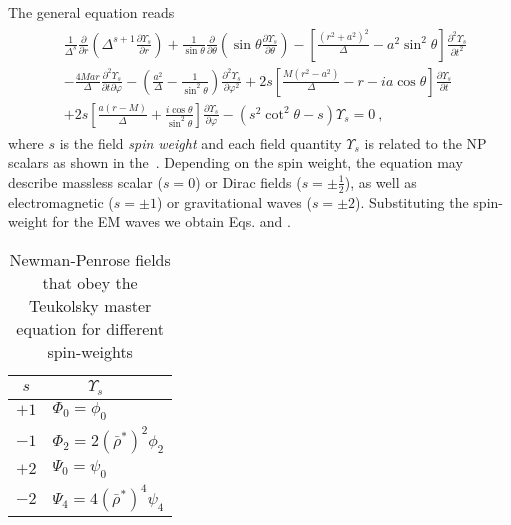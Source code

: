 The general equation reads
\begin{align}
    \begin{split}
        & \frac{1}{\Delta^s} \frac{\partial}{\partial r} \left( \Delta^{s+1} \frac{\partial \Upsilon_s}{\partial r} \right) 
        + \frac{1}{\sin\theta} \frac{\partial}{\partial\theta} \left( \sin\theta \frac{\partial \Upsilon_s}{\partial \theta} \right) 
        - \left[ \frac{(r^2+a^2)^2}{\Delta} - a^2 \sin^2\theta \right]\frac{\partial^2 \Upsilon_s}{\partial t^2} \\[0.15cm]
        & - \frac{4 M a r}{\Delta}\frac{\partial^2 \Upsilon_s}{\partial t \partial \varphi} 
        - \left( \frac{a^2}{\Delta} -\frac{1}{\sin^2\theta} \right)\frac{\partial^2 \Upsilon_s}{\partial \varphi^2} 
        + 2s\left[ \frac{M(r^2-a^2)}{\Delta} - r - i a \cos\theta \right] \frac{\partial \Upsilon_s}{\partial t} \\[0.15cm]
        &+ 2s\left[ \frac{a(r-M)}{\Delta}+\frac{i \cos\theta}{\sin^2\theta}\right] \frac{\partial \Upsilon_s}{\partial \varphi}
        - (s^2 \cot^2\theta - s) \Upsilon_s = 0 ~,
    \end{split}
    \label{eq3:teukolsky}
\end{align}
where $s$ is the field \emph{spin weight} and each field quantity $\Upsilon_s$ is related to the NP scalars as shown in the~.
Depending on the spin weight, the equation may describe massless scalar ($s=0$) or Dirac fields ($s=\pm \tfrac{1}{2}$), as well as electromagnetic ($s=\pm 1$) or gravitational waves ($s=\pm 2$). Substituting the spin-weight for the EM waves we obtain Eqs.  and .
\begin{table}[h]
    \centering
    \tabulinesep=1.5mm
    \begin{tabu}{@{\hskip 0.25cm}c@{\hskip 0.75cm}l@{\hskip 0.25cm}}
        \hline
        $s$ & $\qquad ~ \Upsilon_s$ \\
        \hline\hline
        $+1$ & $\Phi_0 = \phi_0$ \\
        \hline
        $-1$ & $\Phi_2 = 2 (\bar{\rho}^*)^2 \phi_2$ \\
        \hline
        $+2$ & $\Psi_0 = \psi_0$  \\
        \hline
        $-2$ & $\Psi_4 = 4 (\bar{\rho}^*)^4 \psi_4$ \\
        \hline
    \end{tabu}
    \caption{Newman-Penrose fields that obey the Teukolsky master equation for different spin-weights \cite{Chandrasekhar1998}}
    \label{tb3:solutionsTeukolskyEq}
\end{table}

